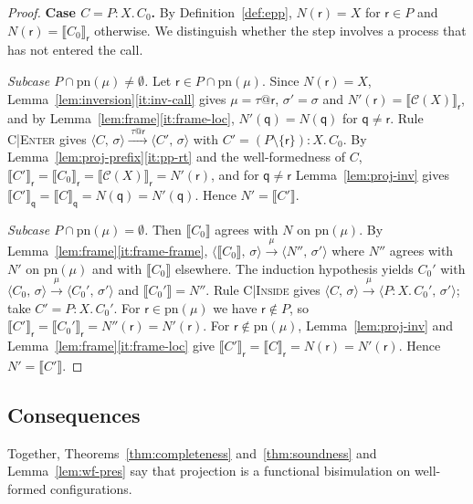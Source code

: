 \documentclass[11pt]{article}
\makeatletter
\theoremstyle{plain}
\theoremstyle{definition}
\theoremstyle{remark}
\newcommand{\qq}{\mathsf{q}}
\newcommand{\rr}{\mathsf{r}}
\newcommand{\pn}{\mathrm{pn}}
\newcommand{\conf}[2]{\langle #1,\, #2\rangle}
\newcommand{\lto}[1]{\xrightarrow{\;#1\;}}
\newcommand{\proj}[2]{\llbracket #1 \rrbracket_{#2}}
\newcommand{\projn}[1]{\llbracket #1 \rrbracket}
\newcommand{\tauat}[1]{\tau\mathord{@}#1}
\newcommand{\rn}[1]{{\normalfont\scshape #1}}
\newcommand{\case}[1]{\medskip\noindent\textbf{Case #1.}\;}
\newcommand{\subcase}[1]{\smallskip\noindent\textit{Subcase #1.}\;}
\newcommand{\Defs}{\mathcal{C}}
\newcommand{\body}[1]{\Defs(#1)}
\newcommand{\rt}[3]{#1\mathbin{:}#2.\,#3}
\makeatother
\begin{document}
\begin{proof}
  \case{$C = \rt{P}{X}{C_0}$}
  By Definition~\ref{def:epp}, $N(\rr) = X$ for $\rr\in P$ and
  $N(\rr) = \proj{C_0}{\rr}$ otherwise.  We distinguish whether the step
  involves a process that has not entered the call.

  \subcase{$P\cap\pn(\mu)\neq\emptyset$}
  Let $\rr\in P\cap\pn(\mu)$.  Since $N(\rr) = X$,
  Lemma~\ref{lem:inversion}\ref{it:inv-call} gives $\mu = \tauat\rr$,
  $\sigma' = \sigma$ and $N'(\rr) = \proj{\body{X}}{\rr}$, and by
  Lemma~\ref{lem:frame}\ref{it:frame-loc}, $N'(\qq) = N(\qq)$ for
  $\qq\neq\rr$.  Rule \rn{C|Enter} gives
  $\conf{C}{\sigma}\lto{\tauat\rr}\conf{C'}{\sigma}$ with
  $C' = \rt{(P\setminus\{\rr\})}{X}{C_0}$.  By
  Lemma~\ref{lem:proj-prefix}\ref{it:pp-rt} and the well-formedness of $C$,
  $\proj{C'}{\rr} = \proj{C_0}{\rr} = \proj{\body{X}}{\rr} = N'(\rr)$, and
  for $\qq\neq\rr$ Lemma~\ref{lem:proj-inv} gives
  $\proj{C'}{\qq} = \proj{C}{\qq} = N(\qq) = N'(\qq)$.  Hence
  $N' = \projn{C'}$.

  \subcase{$P\cap\pn(\mu) = \emptyset$}
  Then $\projn{C_0}$ agrees with $N$ on $\pn(\mu)$.  By
  Lemma~\ref{lem:frame}\ref{it:frame-frame},
  $\conf{\projn{C_0}}{\sigma}\lto{\mu}\conf{N''}{\sigma'}$ where $N''$
  agrees with $N'$ on $\pn(\mu)$ and with $\projn{C_0}$ elsewhere.  The
  induction hypothesis yields $C_0'$ with
  $\conf{C_0}{\sigma}\lto{\mu}\conf{C_0'}{\sigma'}$ and $\projn{C_0'} = N''$.
  Rule \rn{C|Inside} gives
  $\conf{C}{\sigma}\lto{\mu}\conf{\rt{P}{X}{C_0'}}{\sigma'}$; take
  $C' = \rt{P}{X}{C_0'}$.  For $\rr\in\pn(\mu)$ we have $\rr\notin P$, so
  $\proj{C'}{\rr} = \proj{C_0'}{\rr} = N''(\rr) = N'(\rr)$.  For
  $\rr\notin\pn(\mu)$, Lemma~\ref{lem:proj-inv} and
  Lemma~\ref{lem:frame}\ref{it:frame-loc} give
  $\proj{C'}{\rr} = \proj{C}{\rr} = N(\rr) = N'(\rr)$.  Hence
  $N' = \projn{C'}$.
\end{proof}

\subsection{Consequences}

Together, Theorems~\ref{thm:completeness} and~\ref{thm:soundness} and
Lemma~\ref{lem:wf-pres} say that projection is a functional bisimulation on
well-formed configurations.
\end{document}
